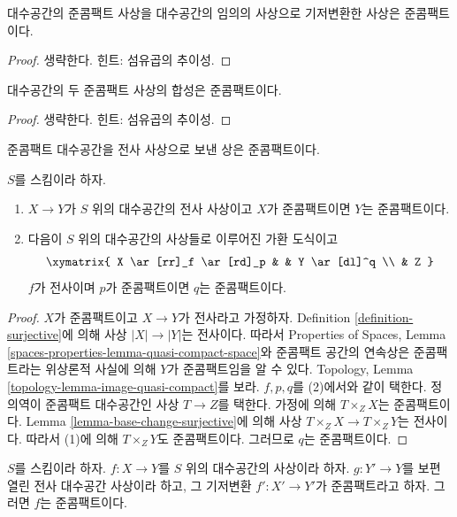\begin{lemma}
\label{lemma-base-change-quasi-compact}
대수공간의 준콤팩트 사상을 대수공간의 임의의 사상으로 기저변환한
사상은 준콤팩트이다.
\end{lemma}

\begin{proof}
생략한다. 힌트: 섬유곱의 추이성.
\end{proof}

\begin{lemma}
\label{lemma-composition-quasi-compact}
대수공간의 두 준콤팩트 사상의 합성은 준콤팩트이다.
\end{lemma}

\begin{proof}
생략한다. 힌트: 섬유곱의 추이성.
\end{proof}

\begin{lemma}
\label{lemma-surjection-from-quasi-compact}
\begin{slogan}
준콤팩트 대수공간을 전사 사상으로 보낸 상은 준콤팩트이다.
\end{slogan}
$S$를 스킴이라 하자.
\begin{enumerate}
\item $X \to Y$가 $S$ 위의 대수공간의 전사 사상이고
$X$가 준콤팩트이면 $Y$는 준콤팩트이다.
\item 다음이 $S$ 위의 대수공간의 사상들로 이루어진 가환 도식이고
$$
\xymatrix{
X \ar[rr]_f \ar[rd]_p & &
Y \ar[dl]^q \\
& Z
}
$$
$f$가 전사이며 $p$가 준콤팩트이면 $q$는 준콤팩트이다.
\end{enumerate}
\end{lemma}

\begin{proof}
$X$가 준콤팩트이고 $X \to Y$가 전사라고 가정하자.
Definition \ref{definition-surjective}에 의해 사상
$|X| \to |Y|$는 전사이다. 따라서 Properties of Spaces, Lemma
\ref{spaces-properties-lemma-quasi-compact-space}와 준콤팩트 공간의
연속상은 준콤팩트라는 위상론적 사실에 의해 $Y$가 준콤팩트임을 알 수 있다.
Topology, Lemma \ref{topology-lemma-image-quasi-compact}를 보라.
$f, p, q$를 (2)에서와 같이 택한다.
정의역이 준콤팩트 대수공간인 사상 $T \to Z$를 택한다.
가정에 의해 $T \times_Z X$는 준콤팩트이다.
Lemma \ref{lemma-base-change-surjective}에 의해 사상
$T \times_Z X \to T \times_Z Y$는 전사이다.
따라서 (1)에 의해 $T \times_Z Y$도 준콤팩트이다.
그러므로 $q$는 준콤팩트이다.
\end{proof}

\begin{lemma}
\label{lemma-descent-quasi-compact}
$S$를 스킴이라 하자.
$f : X \to Y$를 $S$ 위의 대수공간의 사상이라 하자.
$g : Y' \to Y$를 보편 열린 전사 대수공간 사상이라 하고,
그 기저변환 $f' : X' \to Y'$가 준콤팩트라고 하자.
그러면 $f$는 준콤팩트이다.
\end{lemma}

